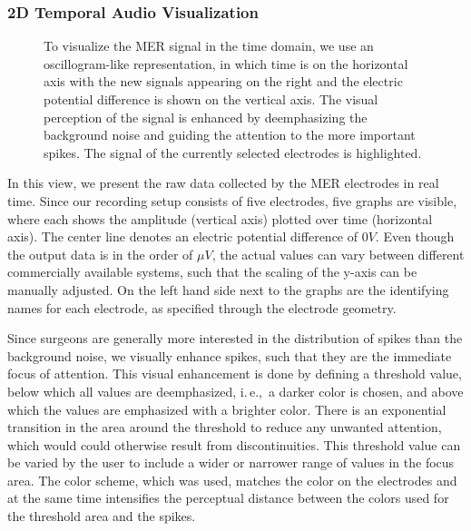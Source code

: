 \documentclass[journal]{vgtc}                %
\begin{document}
\subsubsection{2D Temporal Audio Visualization}\label{sec:overview:recording:mer}
\begin{figure}[b]
    \centering
    \caption{To visualize the MER signal in the time domain, we use an oscillogram-like representation, in which time is on the horizontal axis with the new signals appearing on the right and the electric potential difference is shown on the vertical axis. The visual perception of the signal is enhanced by deemphasizing the background noise and guiding the attention to the more important spikes. The signal of the currently selected electrodes is highlighted.}
    \label{fig:recordingphase:sound}
\end{figure}

In this view, we present the raw data collected by the MER electrodes in real time. Since our recording setup consists of five electrodes, five graphs are visible, where each shows the amplitude (vertical axis) plotted over time (horizontal axis). The center line denotes an electric potential difference of $0V$. Even though the output data is in the order of $\mu V$, the actual values can vary between different commercially available systems, such that the scaling of the y-axis can be manually adjusted. On the left hand side next to the graphs are the identifying names for each electrode, as specified through the electrode geometry.

Since surgeons are generally more interested in the distribution of spikes than the background noise, we visually enhance spikes, such that they are the immediate focus of attention. This visual enhancement is done by defining a threshold value, below which all values are deemphasized, i.\,e.,~a darker color is chosen, and above which the values are emphasized with a brighter color. There is an exponential transition in the area around the threshold to reduce any unwanted attention, which would could otherwise result from discontinuities. This threshold value can be varied by the user to include a wider or narrower range of values in the focus area. The color scheme, which was used, matches the color on the electrodes and at the same time intensifies the perceptual distance between the colors used for the threshold area and the spikes.
\end{document}

